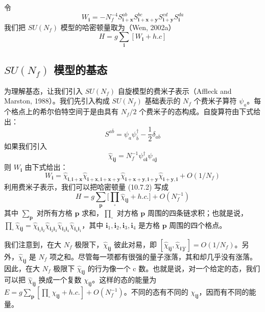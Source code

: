 令
\begin{equation*}
W_{\pmb i}=-N_f^{-4}S^{ab}_{\pmb i+\pmb x}S^{bc}_{\pmb i+\pmb x+\pmb y}S^{cd}_{\pmb i+\pmb y}S^{da}_{\pmb i}
\end{equation*}
我们把 $SU(N_f)$ 模型的哈密顿量取为（Wen, 2002a）
\begin{equation*}
H=g\sum_{\pmb i}[W_{\pmb i}+h.c]\tag{10.7.2}
\end{equation*}

\subsection{$SU(N_f)$ 模型的基态}

为理解基态，让我们引入 $SU(N_f)$ 自旋模型的费米子表示（Affleck and Marston, 1988）。我们先引入构成 $SU(N_f)$ 基础表示的 $N_f$ 个费米子算符 $\psi_a$。每个格点上的希尔伯特空间于是由具有 $N_f/2$ 个费米子的态构成。自旋算符由下式给出：
\begin{equation*}
S^{a\bar b}=\psi_a\psi^{\dagger}_{\bar b}-\frac{1}{2}\delta_{a\bar b}
\end{equation*}
如果我们引入
\begin{equation*}
\hat\chi_{\pmb i\pmb j}=N_f^{-1}\psi^{\dagger}_{a\pmb i}\psi_{a\pmb j}
\end{equation*}
则 $W_{\pmb i}$ 由下式给出：
\begin{equation*}
W_{\pmb i}=\hat\chi_{\pmb i,\pmb i+\pmb x}\hat\chi_{\pmb i+\pmb x,\pmb i+\pmb x+\pmb y}\hat\chi_{\pmb i+\pmb x+\pmb y,\pmb i+\pmb y}\hat\chi_{\pmb i+\pmb y,\pmb i}+O(1/N_f)
\end{equation*}
利用费米子表示，我们可以把哈密顿量 (10.7.2) 写成
\begin{equation*}
H=g\sum_{\pmb p}\Big[\prod_{\square}\hat\chi_{\pmb i\pmb j}+h.c.\Big]+O(N_f^{-1})\tag{10.7.3}
\end{equation*}
其中 $\sum_{\pmb p}$ 对所有方格 $\pmb p$ 求和，$\prod_{\square}$ 对方格 $\pmb p$ 周围的四条链求积；也就是说，$\prod_{\square}\hat\chi_{\pmb i\pmb j}\allowbreak=\hat\chi_{\pmb i_1\pmb i_2}\allowbreak\hat\chi_{\pmb i_2\pmb i_3}\allowbreak\hat\chi_{\pmb i_3\pmb i_4}\allowbreak\hat\chi_{\pmb i_4\pmb i_1}$，其中 $\pmb i_1,\pmb i_2,\pmb i_3,\pmb i_4$ 是方格 $\pmb p$ 周围的四个格点。

我们注意到，在大 $N_f$ 极限下，$\hat\chi_{\pmb i\pmb j}$ 彼此对易，即 $[\hat\chi_{\pmb i\pmb j},\hat\chi_{\pmb i'\pmb j'}]=O(1/N_f)$。另外，$\hat\chi_{\pmb i\pmb j}$ 是 $N_f$ 项之和。尽管每一项都有很强的量子涨落，其和却几乎没有涨落。因此，在大 $N_f$ 极限下 $\hat\chi_{\pmb i\pmb j}$ 的行为像一个 c 数。也就是说，对一个给定的态，我们可以把 $\hat\chi_{\pmb i\pmb j}$ 换成一个复数 $\chi_{\pmb i\pmb j}$。这样的态的能量为 $E=g\sum_{\pmb p}[\prod_{\square}\chi_{\pmb i\pmb j}+h.c.]+O(N_f^{-1})$。不同的态有不同的 $\chi_{\pmb i\pmb j}$，因而有不同的能量。

